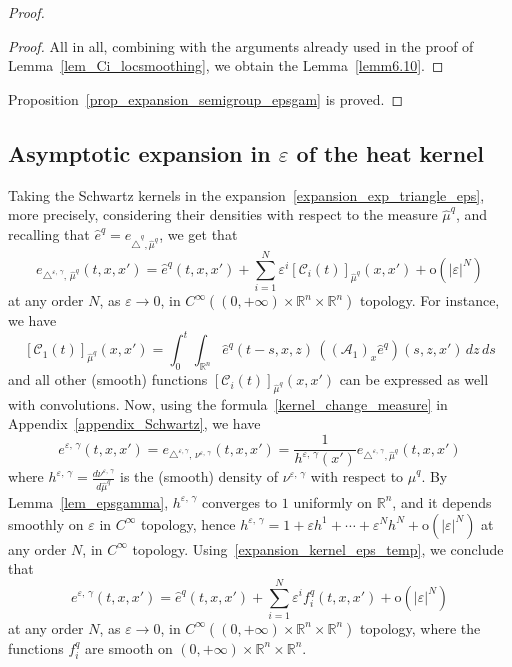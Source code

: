 \documentclass[AHL,Unicode,published]{cedram}
\newcommand*\R{\mathbb{R}}
\newcommand{\calA}{\mathcal{A}}
\newcommand{\calC}{\mathcal{C}}
\newcommand{\rmo}{\mathrm{o}}
\begin{document}
\begin{proof}
\begin{proof}
All in all, combining with the arguments already used in the proof of Lemma~\ref{lem_Ci_locsmoothing}, we obtain the Lemma~\ref{lemm6.10}.
\end{proof}


Proposition~\ref{prop_expansion_semigroup_epsgam} is proved.
\end{proof}



\subsection{Asymptotic expansion in \texorpdfstring{$\varepsilon$}{varepsilon} of the heat kernel}\label{taking_Skernels}
Taking the Schwartz kernels in the expansion~\eqref{expansion_exp_triangle_eps}, more precisely, considering their densities with respect to the measure $\widehat{\mu}^{q}$, and recalling that $\widehat{e}^{q} = e_{\widehat{\triangle}^{q},\widehat{\mu}^{q}}$, we get that
\begin{equation}\label{expansion_kernel_eps_temp}
e_{\triangle^{\varepsilon,\,\gamma},\,\widehat{\mu}^{q}}(t,x,x') = \widehat{e}^{q}(t,x,x') + \sum_{i=1}^N \varepsilon^i [\calC_i(t)]_{\widehat{\mu}^{q}}(x,x') +\rmo\left(\vert\varepsilon\vert^N\right)
\end{equation}
at any order $N$, as $\varepsilon\rightarrow 0$, in $C^\infty((0,+\infty)\times\R^n\times\R^n)$ topology. For instance, we have
\[
[\calC_1(t)]_{\widehat{\mu}^{q}}(x,x') = \int_0^t \int_{\R^n} \widehat{e}^{q}(t-s,x,z) \, \left((\calA_1)_x \widehat{e}^{q}\right) (s,z,x') \, dz\, ds
\]
and all other (smooth) functions $[\calC_i(t)]_{\widehat{\mu}^{q}}(x,x')$ can be expressed as well with convolutions. Now, using the formula~\eqref{kernel_change_measure} in Appendix~\ref{appendix_Schwartz}, we have
\[
e^{\varepsilon,\,\gamma}(t,x,x') = e_{\triangle^{\varepsilon,\gamma},\,\nu^{\varepsilon,\,\gamma}}(t,x,x') = \frac{1}{h^{\varepsilon,\,\gamma}(x')} e_{\triangle^{\varepsilon,\,\gamma},\widehat{\mu}^{q}}(t,x,x')
\]
where $h^{\varepsilon,\,\gamma} = \frac{d \nu^{\varepsilon,\,\gamma}}{d\widehat{\mu}^{q}}$ is the (smooth) density of $\nu^{\varepsilon,\,\gamma}$ with respect to $\widehat{\mu}^{q}$. By Lemma~\ref{lem_epsgamma}, $h^{\varepsilon,\,\gamma}$ converges to $1$ uniformly on $\R^n$, and it depends smoothly on $\varepsilon$ in $C^\infty$ topology, hence $h^{\varepsilon,\,\gamma} = 1 + \varepsilon h^1 + \cdots + \varepsilon^Nh^N+\rmo(\vert\varepsilon\vert^N)$ at any order $N$, in $C^\infty$ topology. Using~\eqref{expansion_kernel_eps_temp}, we conclude that
\begin{equation}\label{expansion_kernel_epsgamma}
e^{\varepsilon,\,\gamma}(t,x,x') = \widehat{e}^{q}(t,x,x') + \sum_{i=1}^N \varepsilon^i f_i^{q}(t,x,x') +\rmo\left(\vert\varepsilon\vert^N\right)
\end{equation}
at any order $N$, as $\varepsilon\rightarrow 0$, in $C^\infty((0,+\infty)\times\R^n\times\R^n)$ topology, where the functions $f_i^{q}$ are smooth on $(0,+\infty)\times\R^n\times\R^n$.
\end{document}
